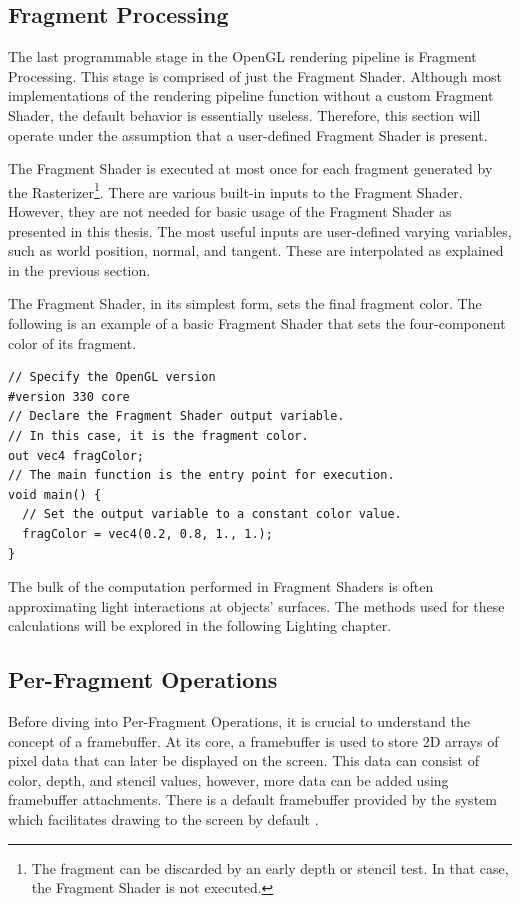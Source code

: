 \documentclass[
  digital,     %
  oneside,     %
  nosansbold,  %
  nocolorbold, %
  lof,         %
  lot,         %
]{fithesis4}
\begin{document}
\subsection{Fragment Processing}
The last programmable stage in the OpenGL rendering pipeline is Fragment Processing.
This stage is comprised of just the Fragment Shader. Although most implementations of the rendering pipeline function
without a custom Fragment Shader, the default behavior is essentially useless. Therefore, this section will
operate under the assumption that a user-defined Fragment Shader is present.

The Fragment Shader is executed at most once for each fragment generated by the Rasterizer\footnote{The fragment
can be discarded by an early depth or stencil test. In that case, the Fragment Shader is not executed.}.
There are various built-in inputs to the Fragment Shader. However, they are not needed for basic usage of the
Fragment Shader as presented in this thesis. The most useful inputs are user-defined varying variables,
such as world position, normal, and tangent. These are interpolated as explained in the previous section.

The Fragment Shader, in its simplest form, sets the final fragment color. The following is an example
of a basic Fragment Shader that sets the four-component color of its fragment.
\begin{verbatim}
// Specify the OpenGL version
#version 330 core
// Declare the Fragment Shader output variable.
// In this case, it is the fragment color.
out vec4 fragColor;
// The main function is the entry point for execution.
void main() {
  // Set the output variable to a constant color value.
  fragColor = vec4(0.2, 0.8, 1., 1.);
}
\end{verbatim}

The bulk of the computation performed in Fragment Shaders is often approximating light interactions at objects' surfaces.
The methods used for these calculations will be explored in the following Lighting chapter.

\subsection{Per-Fragment Operations}
Before diving into Per-Fragment Operations, it is crucial to understand the concept of a framebuffer.
At its core, a framebuffer is used to store 2D arrays of pixel data that can later be displayed on the screen.
This data can consist of color, depth, and stencil values, however, more data can be added using framebuffer
attachments. There is a default framebuffer provided by the system which facilitates drawing to the screen by default \cite{opengl-spec}.
\end{document}
